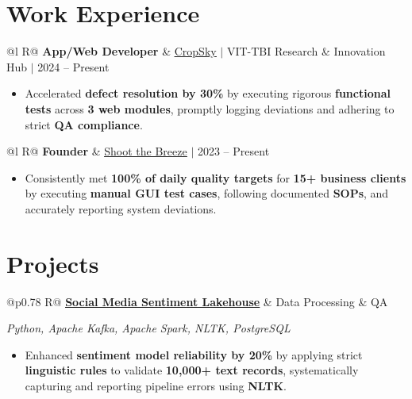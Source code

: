 \documentclass[a4paper,10pt]{article}
\newcommand{\ulink}[2]{\href{#1}{\uline{#2}}}
\newcommand{\subheading}[1]{{\color[HTML]{0A0A0A}\fontsize{12}{14}\selectfont\bfseries #1}}
\newcommand{\techstack}[1]{{\color[HTML]{5C5C5C}\fontsize{10.5}{12.5}\selectfont\itshape #1}}
\newcommand{\meta}[1]{{\color[HTML]{5C5C5C}\fontsize{10.5}{12.5}\selectfont #1}}
\begin{document}
\vspace{2pt}

\section{Work Experience}
\vspace{2pt}

\begin{tabularx}{\linewidth}{@{}l R@{}}
\subheading{App/Web Developer} & \meta{\ulink{https://sites.google.com/view/cropsky/home}{CropSky} $|$ VIT-TBI Research \& Innovation Hub $|$ 2024 -- Present}
\end{tabularx}
\begin{itemize}[nosep, leftmargin=1.5em, itemsep=1pt, topsep=2pt]
  \item {\color[HTML]{0A0A0A}\fontsize{11}{14}\selectfont Accelerated \textbf{defect resolution by 30\%} by executing rigorous \textbf{functional tests} across \textbf{3 web modules}, promptly logging deviations and adhering to strict \textbf{QA compliance}.}
\end{itemize}

\vspace{2pt}

\begin{tabularx}{\linewidth}{@{}l R@{}}
\subheading{Founder} & \meta{\ulink{https://shoot-the-breeze.vercel.app}{Shoot the Breeze} $|$ 2023 -- Present}
\end{tabularx}
\begin{itemize}[nosep, leftmargin=1.5em, itemsep=1pt, topsep=2pt]
  \item {\color[HTML]{0A0A0A}\fontsize{11}{14}\selectfont Consistently met \textbf{100\% of daily quality targets} for \textbf{15+ business clients} by executing \textbf{manual GUI test cases}, following documented \textbf{SOPs}, and accurately reporting system deviations.}
\end{itemize}

\vspace{2pt}

\section{Projects}
\vspace{2pt}

\begin{tabularx}{\linewidth}{@{}p{0.78\linewidth} R@{}}
\subheading{\ulink{https://github.com/su-jin1425/Social-Media-Sentiment-Lakehouse}{Social Media Sentiment Lakehouse}} & \meta{Data Processing \& QA}
\end{tabularx}
\vspace{1pt}
\techstack{Python, Apache Kafka, Apache Spark, NLTK, PostgreSQL}
\begin{itemize}[nosep, leftmargin=1.5em, itemsep=1pt, topsep=2pt]
  \item {\color[HTML]{0A0A0A}\fontsize{11}{14}\selectfont Enhanced \textbf{sentiment model reliability by 20\%} by applying strict \textbf{linguistic rules} to validate \textbf{10,000+ text records}, systematically capturing and reporting pipeline errors using \textbf{NLTK}.}
\end{itemize}
\end{document}
